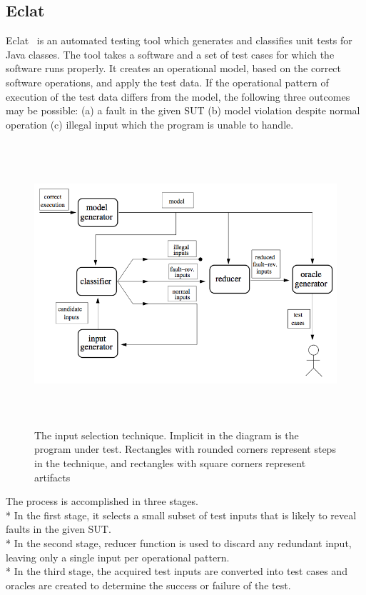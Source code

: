 \subsection{Eclat}
Eclat~\cite{pacheco2005eclat} is an automated testing tool which generates and classifies unit tests for Java classes. The tool takes a software and a set of test cases for which the software runs properly. It creates an operational model, based on the correct software operations, and apply the test data. If the operational pattern of execution of the test data differs from the model, the following three outcomes may be possible: (a) a fault in the given SUT (b) model violation despite normal operation (c) illegal input which the program is unable to handle.

\begin{figure}[h]
	\centering
	\includegraphics[width=15cm, height=10.5cm]{chapter2/eclat_working.png}
	\caption{The input selection technique. Implicit in the diagram is the program under test. Rectangles with rounded corners represent steps in the technique, and rectangles with square corners represent artifacts~\cite{pacheco2005eclat}}
	\label{fig:eclat}
\end{figure}

The process is accomplished in three stages. \\*
In the first stage, it selects a small subset of test inputs that is likely to reveal faults in the given SUT. \\*
In the second stage, reducer function is used to discard any redundant input, leaving only a single input per operational pattern. \\*
In the third stage, the acquired test inputs are converted into test cases and oracles are created to determine the success or failure of the test.

